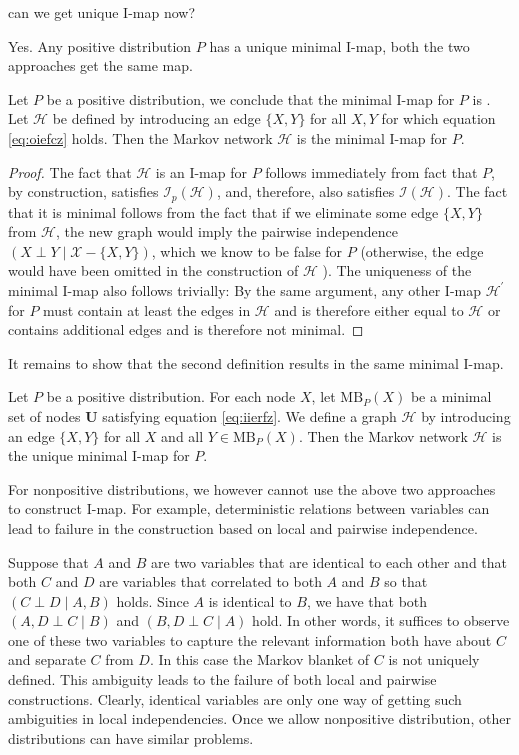 \documentclass{article}
\begin{document}
 can we get unique I-map now?

 Yes. Any positive distribution $P$ has a unique minimal I-map, both the two approaches get the same map.
\begin{thma}
Let $P$ be a positive distribution, we conclude that the minimal I-map for $P$ is . Let $\mathcal{H}$ be defined by introducing an edge $\{X, Y\}$ for all $X, Y$ for which equation \cref{eq:oiefcz} holds. Then the Markov network $\mathcal{H}$ is the  minimal I-map for $P$.
\end{thma}
\begin{proof}
The fact that $\mathcal{H}$ is an I-map for $P$ follows immediately from fact that $P$, by construction, satisfies $\mathcal{I}_{p}(\mathcal{H})$, and, therefore, also satisfies $\mathcal{I}(\mathcal{H})$. The fact that it is minimal follows from the fact that if we eliminate some edge $\{X, Y\}$ from $\mathcal{H}$, the new graph would imply the pairwise independence $(X \perp Y \mid \mathcal{X}-\{X, Y\})$, which we know to be false for $P$ (otherwise, the edge would have been omitted in the construction of $\mathcal{H}$ ). The uniqueness of the minimal I-map also follows trivially: By the same argument, any other I-map $\mathcal{H}^{\prime}$ for $P$ must contain at least the edges in $\mathcal{H}$ and is therefore either equal to $\mathcal{H}$ or contains additional edges and is therefore not minimal.
\end{proof} 
It remains to show that the second definition results in the same minimal I-map.
\begin{thma}
Let $P$ be a positive distribution. For each node $X$, let $\mathrm{MB}_{P}(X)$ be a minimal set of nodes $\boldsymbol{U}$ satisfying equation \cref{eq:iierfz}. We define a graph $\mathcal{H}$ by introducing an edge $\{X, Y\}$ for all $X$ and all $Y \in \mathrm{MB}_{P}(X)$. Then the Markov network $\mathcal{H}$ is the unique minimal I-map for $P$.
\end{thma}

For nonpositive distributions, we however cannot use the above two approaches to construct I-map. For example, deterministic relations between variables can lead to failure in the construction based on local and pairwise independence.
\begin{exma}
Suppose that $A$ and $B$ are two variables that are identical to each other and that both $C$ and $D$ are variables that correlated to both $A$ and $B$ so that $(C \perp D \mid A, B)$ holds. Since $A$ is identical to $B$, we have that both $(A, D \perp C \mid B)$ and $(B, D \perp C \mid A)$ hold. In other words, it suffices to observe one of these two variables to capture the relevant information both have about $C$ and separate $C$ from $D$. In this case the Markov blanket of $C$ is not uniquely defined. This ambiguity leads to the failure of both local and pairwise constructions. Clearly, identical variables are only one way of getting such ambiguities in local independencies. Once we allow nonpositive distribution, other distributions can have similar problems.
\end{exma}
\end{document}
